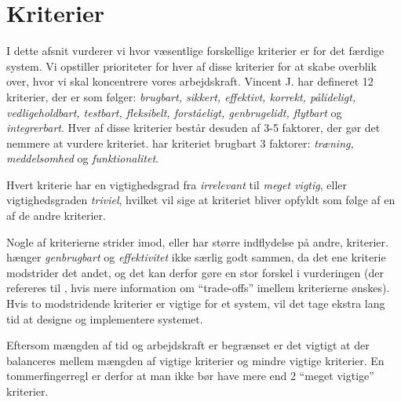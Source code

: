 \section{Kriterier}
\label{sec:kriterier}

I dette afsnit vurderer vi hvor væsentlige forskellige kriterier er for det færdige system. Vi opstiller prioriteter for hver af disse kriterier for at skabe overblik over, hvor vi skal koncentrere vores arbejdskraft. Vincent J. har defineret 12 kriterier\cite{crit}, der er som følger: \emph{brugbart, sikkert, effektivt, korrekt, pålideligt, vedligeholdbart, testbart, fleksibelt, forståeligt, genbrugelidt, flytbart} og \emph{integrerbart}. Hver af disse kriterier består desuden af 3-5 faktorer, der gør det nemmere at vurdere kriteriet. \Fx har kriteriet brugbart 3 faktorer: \emph{træning, meddelsomhed} og \emph{funktionalitet}.

Hvert kriterie har en vigtighedsgrad fra \emph{irrelevant} til \emph{meget vigtig}, eller vigtighedsgraden \emph{triviel}, hvilket vil sige at kriteriet bliver opfyldt som følge af en af de andre kriterier.
 
Nogle af kriterierne strider imod, eller har større indflydelse på andre, kriterier. \Fx hænger \emph{genbrugbart} og \emph{effektivitet} ikke særlig godt sammen, da det ene kriterie modstrider det andet, og det kan derfor gøre en stor forskel i vurderingen (der refereres til \cite[s.~18]{crit}, hvis mere information om ``trade-offs'' imellem kriterierne ønskes). Hvis to modstridende kriterier er vigtige for et system, vil det tage ekstra lang tid at designe og implementere systemet.

Eftersom mængden af tid og arbejdskraft er begrænset er det vigtigt at der balanceres mellem mængden af vigtige kriterier og mindre vigtige kriterier. En tommerfingerregl er derfor at man ikke bør have mere end 2 ``meget vigtige'' kriterier.






